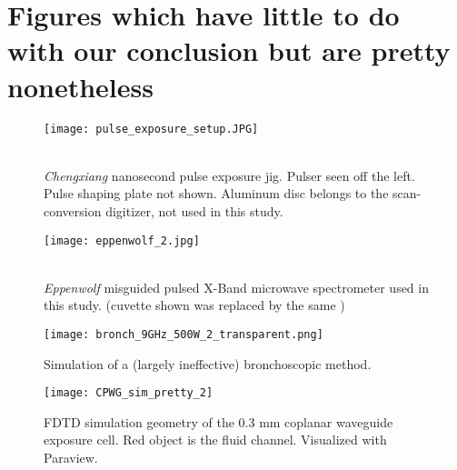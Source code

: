 \documentclass[fleqn,10pt]{article}
\begin{document}



\tableofcontents



\section{Figures which have little to do with our conclusion but are pretty nonetheless}

\begin{figure}[H]
	\captionsetup{singlelinecheck = false, justification=justified}
	\centering
	\texttt{[image: pulse\_exposure\_setup.JPG]}
	\caption{\\ \textit{Chengxiang} nanosecond pulse exposure jig. Pulser seen off the left. Pulse shaping plate not shown. Aluminum disc belongs to the scan-conversion digitizer, not used in this study.}
\end{figure}
	
\begin{figure}[H]
	\captionsetup{singlelinecheck = false, justification=justified}
	\centering
	\texttt{[image: eppenwolf\_2.jpg]}
	\caption{\\ \textit{Eppenwolf} misguided pulsed X-Band microwave spectrometer used in this study. (cuvette shown was replaced by the same )}
\end{figure}

\begin{figure}[H]
	\captionsetup{singlelinecheck = false, justification=justified}
	\centering
	\texttt{[image: bronch\_9GHz\_500W\_2\_transparent.png]}
	\caption{Simulation of a (largely ineffective) bronchoscopic method.}
\end{figure}



%




\begin{figure}[H]
	\captionsetup{singlelinecheck = false, justification=justified}
	\centering
	\texttt{[image: CPWG\_sim\_pretty\_2]}
	\caption{FDTD simulation geometry of the 0.3 mm coplanar waveguide exposure cell. Red object is the fluid channel. Visualized with Paraview.
		}
\end{figure}
\end{document}
